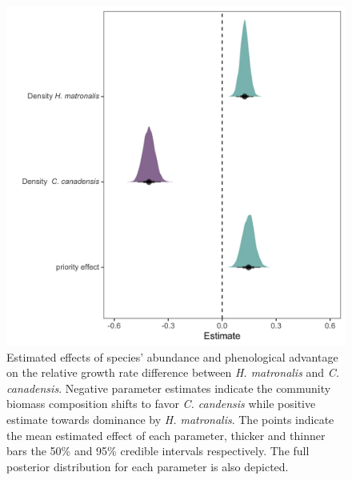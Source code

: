 \documentclass{article}\usepackage[]{graphicx}\usepackage[]{color}
\begin{document}
{\begin{figure}[h!]
    \centering
\includegraphics[width=\textwidth]{..//figure/mu_plots.jpeg}
    \caption{Estimated effects of species' abundance and phenological advantage on the relative growth rate difference between \textit{H. matronalis} and \textit{C. canadensis}. Negative parameter estimates indicate the community biomass composition shifts to favor \textit{C. candensis} while positive estimate towards dominance by \textit{ H. matronalis}. The points indicate the mean estimated effect of each parameter, thicker  and thinner bars the 50\% and 95\% credible intervals respectively. The full posterior distribution for each parameter is also depicted. 
    } 
    \label{fig:RGRD}
\end{figure}

}
\end{document}
